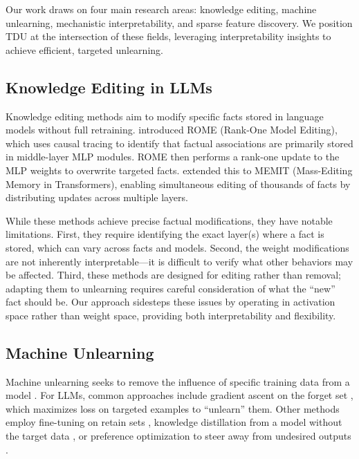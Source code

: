 \label{sec:related_work}

Our work draws on four main research areas: knowledge editing, machine unlearning, mechanistic interpretability, and sparse feature discovery. We position TDU at the intersection of these fields, leveraging interpretability insights to achieve efficient, targeted unlearning.

\subsection{Knowledge Editing in LLMs}

Knowledge editing methods aim to modify specific facts stored in language models without full retraining. \citet{meng2022locating} introduced ROME (Rank-One Model Editing), which uses causal tracing to identify that factual associations are primarily stored in middle-layer MLP modules. ROME then performs a rank-one update to the MLP weights to overwrite targeted facts. \citet{meng2023massediting} extended this to MEMIT (Mass-Editing Memory in Transformers), enabling simultaneous editing of thousands of facts by distributing updates across multiple layers.

While these methods achieve precise factual modifications, they have notable limitations. First, they require identifying the exact layer(s) where a fact is stored, which can vary across facts and models. Second, the weight modifications are not inherently interpretable---it is difficult to verify what other behaviors may be affected. Third, these methods are designed for editing rather than removal; adapting them to unlearning requires careful consideration of what the ``new'' fact should be. Our approach sidesteps these issues by operating in activation space rather than weight space, providing both interpretability and flexibility.

\subsection{Machine Unlearning}

Machine unlearning seeks to remove the influence of specific training data from a model \citep{bourtoule2021machine, cao2015towards}. For LLMs, common approaches include gradient ascent on the forget set \citep{jang2023knowledge, yao2024large}, which maximizes loss on targeted examples to ``unlearn'' them. Other methods employ fine-tuning on retain sets \citep{maini2024tofu}, knowledge distillation from a model without the target data \citep{chundawat2023can}, or preference optimization to steer away from undesired outputs \citep{zhang2024negative}.

